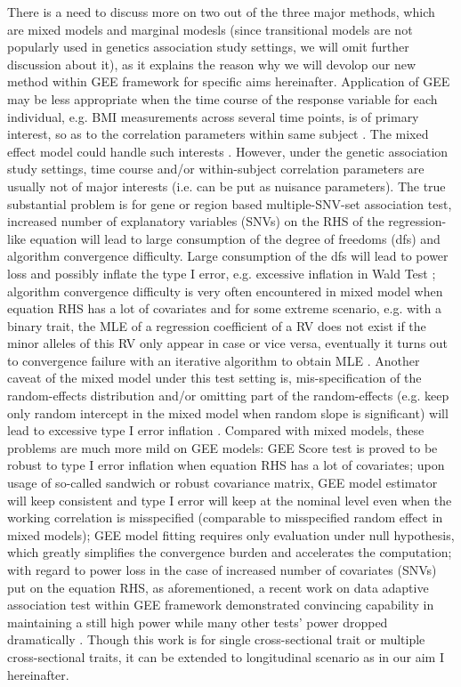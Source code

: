 \documentclass[12pt]{article}
\begin{document}
There is a need to discuss more on two out of the three major methods, which are mixed models and marginal modesls (since transitional models are not popularly used in genetics association study settings, we will omit further discussion about it), as it explains the reason why we will devolop our new method within GEE framework for specific aims hereinafter. Application of GEE may be less appropriate when the time course of the response variable for each individual, e.g. BMI measurements across several time points, is of primary interest, so as to the correlation parameters within same subject \cite{zeger1988models,liang1986longitudinal}. The mixed effect model could handle such interests \cite{laird1982random}. However, under the genetic association study settings, time course and/or within-subject correlation parameters are usually not of major interests (i.e. can be put as nuisance parameters). The true substantial problem is for gene or region based multiple-SNV-set association test, increased number of explanatory variables (SNVs) on the RHS of the regression-like equation will lead to large consumption of the degree of freedoms (dfs) and algorithm convergence difficulty. Large consumption of the dfs will lead to power loss and possibly inflate the type I error, e.g. excessive inflation in Wald Test \cite{guo2005small,pan2001robust,shete2004effect}; algorithm convergence difficulty is very often encountered in mixed model when equation RHS has a lot of covariates and for some extreme scenario, e.g. with a binary trait, the MLE of a regression coefficient of a RV does not exist if the minor alleles of this RV only appear in case or vice versa, eventually it turns out to convergence failure with an iterative algorithm to obtain MLE \cite{zhang2014testing,pan2014powerful}. Another caveat of the mixed model under this test setting is, mis-specification of the random-effects distribution and/or omitting part of the random-effects (e.g. keep only random intercept in the mixed model when random slope is significant) will lead to excessive type I error inflation \cite{litiere2007type,Xu2014}. Compared with mixed models, these problems are much more mild on GEE models: GEE Score test is proved to be robust to type I error inflation when equation RHS has a lot of covariates; upon usage of so-called sandwich or robust covariance matrix, GEE model estimator will keep consistent and type I error will keep at the nominal level even when the working correlation is misspecified (comparable to misspecified random effect in mixed models); GEE model fitting requires only evaluation under null hypothesis, which greatly simplifies the convergence burden and accelerates the computation; with regard to power loss in the case of increased number of covariates (SNVs) put on the equation RHS, as aforementioned, a recent work on data adaptive association test within GEE framework demonstrated convincing capability in maintaining a still high power while many other tests' power dropped dramatically \cite{zhang2014testing,pan2014powerful}. Though this work is for single cross-sectional trait or multiple cross-sectional traits, it can be extended to longitudinal scenario as in our aim I hereinafter. 
\end{document}
